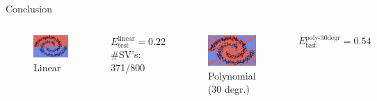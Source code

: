 \documentclass[9.5pt]{beamer}
\begin{document}
    \begin{frame}{Conclusion}
        \bigskip
        \bigskip
        \begin{columns}[onlytextwidth]
            \scriptsize
            \centering
            \begin{figure}
                \centering
                \includegraphics[width=\linewidth]{image-20220624192228376}
                \caption{Linear}
            \end{figure}
            \[E_{\text{test}}^{\text{linear}} = 0.22\]
            #SV’s: 371/800
            \centering
            \begin{figure}
                \centering
                \includegraphics[width=\linewidth]{images/30}
                \caption{Polynomial (30 degr.)}
            \end{figure}
            \[E_{\text{test}}^{\text{poly-30degr}} = 0.54\]

\end{columns}
\end{frame}
\end{document}
